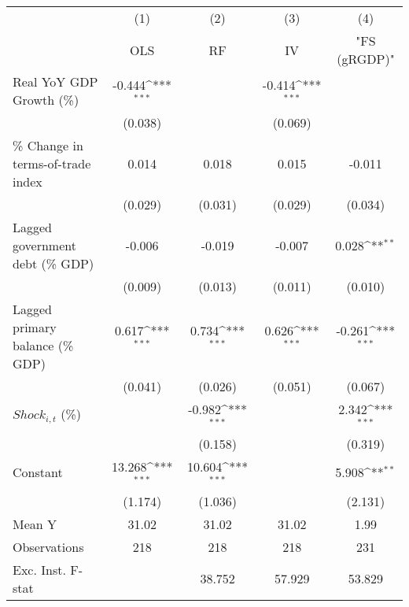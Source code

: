 {
\def\sym#1{\ifmmode^{#1}\else\(^{#1}\)\fi}
\begin{tabular}{l*{4}{c}}
\toprule
                    &\multicolumn{1}{c}{(1)}&\multicolumn{1}{c}{(2)}&\multicolumn{1}{c}{(3)}&\multicolumn{1}{c}{(4)}\\
                    &\multicolumn{1}{c}{OLS}&\multicolumn{1}{c}{RF}&\multicolumn{1}{c}{IV}&\multicolumn{1}{c}{ "FS (gRGDP)" }\\
\midrule
Real YoY GDP Growth (\%)&      -0.444\sym{***}&                     &      -0.414\sym{***}&                     \\
                    &     (0.038)         &                     &     (0.069)         &                     \\
\addlinespace
\% Change in terms-of-trade index&       0.014         &       0.018         &       0.015         &      -0.011         \\
                    &     (0.029)         &     (0.031)         &     (0.029)         &     (0.034)         \\
\addlinespace
Lagged government debt (\% GDP)&      -0.006         &      -0.019         &      -0.007         &       0.028\sym{**} \\
                    &     (0.009)         &     (0.013)         &     (0.011)         &     (0.010)         \\
\addlinespace
Lagged primary balance (\% GDP)&       0.617\sym{***}&       0.734\sym{***}&       0.626\sym{***}&      -0.261\sym{***}\\
                    &     (0.041)         &     (0.026)         &     (0.051)         &     (0.067)         \\
\addlinespace
$ Shock_{i,t}$ (\%) &                     &      -0.982\sym{***}&                     &       2.342\sym{***}\\
                    &                     &     (0.158)         &                     &     (0.319)         \\
\addlinespace
Constant            &      13.268\sym{***}&      10.604\sym{***}&                     &       5.908\sym{**} \\
                    &     (1.174)         &     (1.036)         &                     &     (2.131)         \\
\midrule
Mean Y              &       31.02         &       31.02         &       31.02         &        1.99         \\
Observations        &         218         &         218         &         218         &         231         \\
Exc. Inst. F-stat   &                     &      38.752         &      57.929         &      53.829         \\
\bottomrule
\end{tabular}
}
